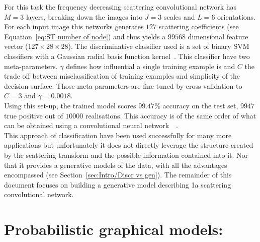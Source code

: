 \documentclass[a4paper,11pt]{report}
\begin{document}
		For this task the frequency decreasing scattering convolutional network has $M=3$ layers, breaking down the images into $J=3$ scales and $L=6$ orientations. For each input image this networks generates $127$ scattering coefficients (see Equation~\ref{eq:ST number of node}) and thus yields a $99568$ dimensional feature vector ($127 \times 28 \times 28$). The discriminative classifier used is a set of binary SVM classifiers with a Gaussian radial basis function kernel~\citep{scholkopf1997comparing}. This classifier have two meta-parameters. $\gamma$ defines how influential a single training example is and $C$ the trade off between misclassification of training examples and simplicity of the decision surface. Those meta-parameters are fine-tuned by cross-validation to $C = 3$ and $\gamma = 0.0018$.\\
		
		Using this set-up, the trained model scores $99.47\%$ accuracy on the test set, \ie $9947$ true positive out of $10000$ realisations. This accuracy is of the same order of what can be obtained using a convolutional neural network~\citep{jarrett2009best}~\citep{lecun2015web}.\\
		
		This approach of classification have been used successfully for many more applications but unfortunately it does not directly leverage the structure created by the scattering transform and the possible information contained into it. Nor that it provides a generative models of the data, with all the advantages encompassed (see Section~\ref{sec:Intro/Discr vs gen}). The remainder of this document focuses on building a generative model describing 1a scattering convolutional network.
    
    
\chapter{Probabilistic graphical models:}
  \label{chap:PGMs}
  
\end{document}
